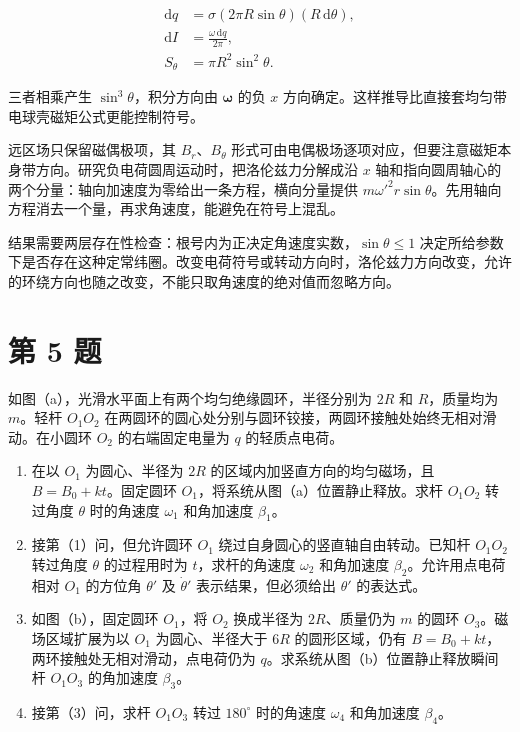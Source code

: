 \documentclass[12pt,a4paper,UTF8]{ctexart}
\newcommand{\tightlist}{\setlength{\itemsep}{0pt}\setlength{\parskip}{0pt}}
\begin{document}
\[\begin{aligned}
\mathrm dq&=\sigma(2\pi R\sin\theta)(R\,\mathrm d\theta),\\
\mathrm dI&=\frac{\omega\,\mathrm dq}{2\pi},\\
S_\theta&=\pi R^2\sin^2\theta.
\end{aligned}\]

三者相乘产生 \(\sin^3\theta\)，积分方向由 \(\boldsymbol\omega\) 的负
\(x\) 方向确定。这样推导比直接套均匀带电球壳磁矩公式更能控制符号。

远区场只保留磁偶极项，其 \(B_r\)、\(B_\theta\)
形式可由电偶极场逐项对应，但要注意磁矩本身带方向。研究负电荷圆周运动时，把洛伦兹力分解成沿
\(x\)
轴和指向圆周轴心的两个分量：轴向加速度为零给出一条方程，横向分量提供
\(m\omega'^2r\sin\theta\)。先用轴向方程消去一个量，再求角速度，能避免在符号上混乱。

结果需要两层存在性检查：根号内为正决定角速度实数，\(\sin\theta\leqslant1\)
决定所给参数下是否存在这种定常纬圈。改变电荷符号或转动方向时，洛伦兹力方向改变，允许的环绕方向也随之改变，不能只取角速度的绝对值而忽略方向。

\newpage

\section{第 5 题}\label{ux7b2c-5-ux9898}

如图（a），光滑水平面上有两个均匀绝缘圆环，半径分别为 \(2R\) 和
\(R\)，质量均为 \(m\)。轻杆 \(O_1O_2\)
在两圆环的圆心处分别与圆环铰接，两圆环接触处始终无相对滑动。在小圆环
\(O_2\) 的右端固定电量为 \(q\) 的轻质点电荷。

\begin{enumerate}
\def\labelenumi{\arabic{enumi}.}
\tightlist
\item
  在以 \(O_1\) 为圆心、半径为 \(2R\) 的区域内加竖直方向的均匀磁场，且
  \(B=B_0+kt\)。固定圆环 \(O_1\)，将系统从图（a）位置静止释放。求杆
  \(O_1O_2\) 转过角度 \(\theta\) 时的角速度 \(\omega_1\) 和角加速度
  \(\beta_1\)。
\item
  接第（1）问，但允许圆环 \(O_1\) 绕过自身圆心的竖直轴自由转动。已知杆
  \(O_1O_2\) 转过角度 \(\theta\) 的过程用时为 \(t\)，求杆的角速度
  \(\omega_2\) 和角加速度 \(\beta_2\)。允许用点电荷相对 \(O_1\) 的方位角
  \(\theta'\) 及 \(\dot\theta'\) 表示结果，但必须给出 \(\theta'\)
  的表达式。
\item
  如图（b），固定圆环 \(O_1\)，将 \(O_2\) 换成半径为 \(2R\)、质量仍为
  \(m\) 的圆环 \(O_3\)。磁场区域扩展为以 \(O_1\) 为圆心、半径大于 \(6R\)
  的圆形区域，仍有 \(B=B_0+kt\)，两环接触处无相对滑动，点电荷仍为
  \(q\)。求系统从图（b）位置静止释放瞬间杆 \(O_1O_3\) 的角加速度
  \(\beta_3\)。
\item
  接第（3）问，求杆 \(O_1O_3\) 转过 \(180^\circ\) 时的角速度
  \(\omega_4\) 和角加速度 \(\beta_4\)。
\end{enumerate}
\end{document}

